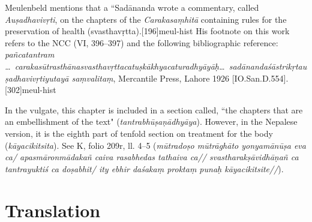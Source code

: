 Meulenbeld mentions that a ``Sadānanda wrote a commentary, called \emph{Auṣadhavivṛti}, on the chapters of the
\emph{Carakasaṃhitā} containing rules for the preservation of health 
(svasthavṛtta).[196]{meul-hist} His footnote on this work refers to 
the NCC (VI, 396–397) and the following bibliographic reference: 
\emph{pañcatantram \ldots\  
carakasūtrasthānasvasthavṛttacatuṣkākhyacaturadhyāyāḥ\ldots\
sadānandaśāstrikṛtauṣadhavivṛtiyutayā saṃvalitaṃ}, Mercantile Press, Lahore 
1926 [IO.San.D.554].\fvolcite{IB}[302]{meul-hist}

In the vulgate, this chapter is included in a section called, ``the chapters that 
are an embellishment of the text" (\emph{tantrabhūṣaṇādhyāya}). However, in 
the Nepalese version, it is the eighth part of tenfold section on treatment for the 
body (\emph{kāyacikitsita}). See K, folio 209r, ll. 4--5 
(\emph{mūtradoṣo mūtrāghāto yonyamānūṣa eva ca/  
apasmāronmādakañ caiva rasabhedas tathaiva ca// 
svastharakṣāvidhāṇañ ca tantrayuktiś ca doṣabhit/
ity ebhir daśakaṃ proktaṃ punaḥ kāyacikitsite//}).


\section{Translation}

